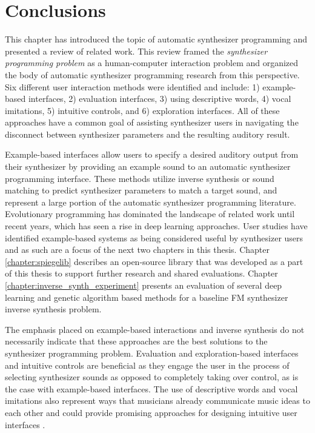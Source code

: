  

\section{Conclusions}
This chapter has introduced the topic of automatic synthesizer programming and presented a review of related work. This review framed the \textit{synthesizer programming problem} as a human-computer interaction problem and organized the body of automatic synthesizer programming research from this perspective. Six different user interaction methods were identified and include: 1) example-based interfaces, 2) evaluation interfaces, 3) using descriptive words, 4) vocal imitations, 5) intuitive controls, and 6) exploration interfaces. All of these approaches have a common goal of assisting synthesizer users in navigating the disconnect between synthesizer parameters and the resulting auditory result.

Example-based interfaces allow users to specify a desired auditory output from their synthesizer by providing an example sound to an automatic synthesizer programming interface. These methods utilize inverse synthesis or sound matching to predict synthesizer parameters to match a target sound, and represent a large portion of the automatic synthesizer programming literature. Evolutionary programming has dominated the landscape of related work until recent years, which has seen a rise in deep learning approaches. User studies have identified example-based systems as being considered useful by synthesizer users \cite{krekovic2019insights} and as such are a focus of the next two chapters in this thesis. Chapter \ref{chapter:spiegelib} describes an open-source library that was developed as a part of this thesis to support further research and shared evaluations. Chapter \ref{chapter:inverse_synth_experiment} presents an evaluation of several deep learning and genetic algorithm based methods for a baseline FM synthesizer inverse synthesis problem.

The emphasis placed on example-based interactions and inverse synthesis do not necessarily indicate that these approaches are the best solutions to the synthesizer programming problem. Evaluation and exploration-based interfaces and intuitive controls are beneficial as they engage the user in the process of selecting synthesizer sounds as opposed to completely taking over control, as is the case with example-based interfaces. The use of descriptive words and vocal imitations also represent ways that musicians already communicate music ideas to each other and could provide promising approaches for designing intuitive user interfaces \cite{pardo2019learning}. 

